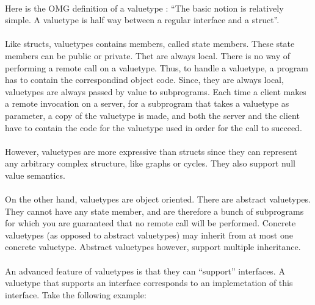 \paragraph{}Here is the OMG definition of a valuetype : ``The basic notion is
relatively simple. A valuetype is half way between a regular interface
and a struct''.

\paragraph{}Like structs, valuetypes contains members, called state
members. These state members can be public or private.
Thet are always local. There is no way of
performing a remote call on a valuetype. Thus, to handle a valuetype,
a program has to contain the correspondind object code. Since, they
are always local, valuetypes are always passed by value to
subprograms. Each time a client makes a remote invocation on a server,
for a subprogram that takes a valuetype as parameter, a copy of the
valuetype is made, and both the server and the client have to contain
the code for the valuetype used in order for the call to succeed.

\paragraph{} However, valuetypes are more expressive than structs
since they can represent any arbitrary complex structure, like graphs
or cycles. They also support null value semantics.

\paragraph{}On the other hand, valuetypes are object oriented. There
are abstract valuetypes. They cannot have any state member, and are
therefore a bunch of subprograms for which you are guaranteed that no
remote call will be performed. Concrete valuetypes
(as opposed to abstract valuetypes) may inherit from at most one
concrete valuetype. Abstract valuetypes however, support multiple inheritance.

\paragraph{}An advanced feature of valuetypes is that they can
``support'' interfaces. A valuetype that supports an interface
corresponds to an implemetation of this interface. Take the following
example:

